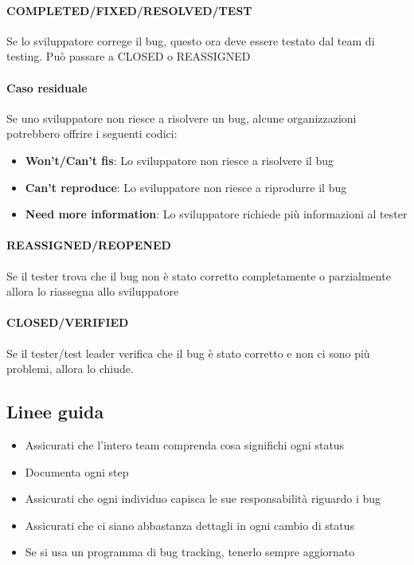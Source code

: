 \documentclass[11pt,a4paper]{book}
\begin{document}
\paragraph{COMPLETED/FIXED/RESOLVED/TEST}
Se lo sviluppatore correge il bug, questo ora deve essere testato dal team di testing. Può passare a CLOSED o REASSIGNED
\paragraph{Caso residuale}
Se uno sviluppatore non riesce a risolvere un bug, alcune organizzazioni potrebbero offrire i seguenti codici:
\begin{itemize}
	\item \textbf{Won't/Can't fis}: Lo sviluppatore non riesce a risolvere il bug
	\item \textbf{Can't reproduce}: Lo sviluppatore non riesce a riprodurre il bug
	\item \textbf{Need more information}: Lo sviluppatore richiede più informazioni al tester
\end{itemize}
\paragraph{REASSIGNED/REOPENED}
Se il tester trova che il bug non è stato corretto completamente o parzialmente  allora lo riassegna allo sviluppatore
\paragraph{CLOSED/VERIFIED}
Se il tester/test leader verifica che il bug è stato corretto e non ci sono più problemi, allora lo chiude.


\subsection{Linee guida}
\begin{itemize}
	\item Assicurati che l'intero team comprenda cosa significhi ogni status
	\item Documenta ogni step
	\item Assicurati che ogni individuo capisca le sue responsabilità riguardo i bug
	\item Assicurati che ci siano abbastanza dettagli in ogni cambio di status
	\item Se si usa un programma di bug tracking, tenerlo sempre aggiornato
\end{itemize}
\end{document}

